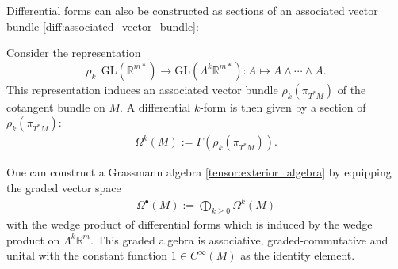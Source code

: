     Differential forms can also be constructed as sections of an associated vector bundle \ref{diff:associated_vector_bundle}:
    \begin{adefinition}
        Consider the representation \[\rho_k:\text{GL}(\mathbb{R}^{m*})\rightarrow\text{GL}(\Lambda^k\mathbb{R}^{m*}): A\mapsto A\wedge\cdots\wedge A.\] This representation induces an associated vector bundle $\rho_k(\pi_{T^*M})$ of the cotangent bundle on $M$. A differential $k$-form is then given by a section of $\rho_k(\pi_{T^*M})$:
        \begin{gather}
            \Omega^k(M) := \Gamma(\rho_k(\pi_{T^*M})).
        \end{gather}
    \end{adefinition}

    \begin{construct}
        One can construct a Grassmann algebra \ref{tensor:exterior_algebra} by equipping the graded vector space
        \begin{gather}
            \Omega^\bullet(M) := \bigoplus_{k\geq0}\Omega^k(M)
        \end{gather}
        with the wedge product of differential forms which is induced by the wedge product on $\Lambda^k\mathbb{R}^m$. This graded algebra is associative, graded-commutative and unital with the constant function $1\in C^{\infty}(M)$ as the identity element.
    \end{construct}

